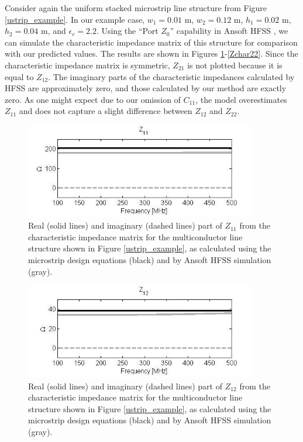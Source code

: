 \documentclass{allertonproc}
\begin{document}
Consider again the uniform stacked microstrip line structure from Figure \ref{ustrip_example}.  In our example case, $w_1 = 0.01$ m, $w_2 = 0.12$ m, $h_1 = 0.02$ m, $h_2 = 0.04$ m, and $\epsilon_r = 2.2$. Using the ``Port $Z_0$'' capability in Ansoft HFSS \cite{HFSS}, we can simulate the characteristic impedance matrix of this structure for comparison with our predicted values.  The results are shown in Figures \ref{Zchar11}-\ref{Zchar22}.  Since the characteristic impedance matrix is symmetric, $Z_{21}$ is not plotted because it is equal to $Z_{12}$.  The imaginary parts of the characteristic impedances calculated by HFSS are approximately zero, and those calculated by our method are exactly zero.  As one might expect due to our omission of $C_{11}$, the model overestimates $Z_{11}$ and does not capture a slight difference between $Z_{12}$ and $Z_{22}$.
\begin{figure}[bp]
\begin{center}
\includegraphics[width=4in]{Zchar11}
\caption{Real (solid lines) and imaginary (dashed lines) part of $Z_{11}$ from the characteristic impedance matrix for the multiconductor line structure shown in Figure \ref{ustrip_example}, as calculated using the microstrip design equations (black) and by Ansoft HFSS simulation (gray).}
\label{Zchar11}
\end{center}
\end{figure}
\begin{figure}[bpt]
\begin{center}
\includegraphics[width=4in]{Zchar12}
\caption{Real (solid lines) and imaginary (dashed lines) part of $Z_{12}$ from the characteristic impedance matrix for the multiconductor line structure shown in Figure \ref{ustrip_example}, as calculated using the microstrip design equations (black) and by Ansoft HFSS simulation (gray).}
\label{Zchar12}
\end{center}
\end{figure}
\end{document}
